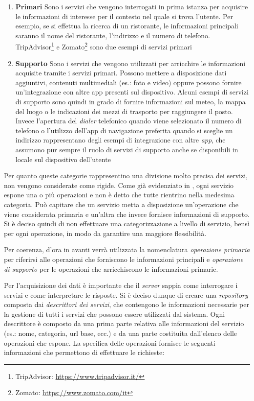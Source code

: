 \begin{enumerate}
	\item \textbf{Primari}
	Sono i servizi che vengono interrogati in prima istanza per acquisire le informazioni di interesse per il contesto nel quale si trova l'utente. Per esempio, se si effettua la ricerca di un ristorante, le informazioni principali saranno il nome del ristorante, l'indirizzo e il numero di telefono. TripAdvisor\footnote{TripAdvisor: \url{https://www.tripadvisor.it/}} e Zomato\footnote{Zomato: \url{https://www.zomato.com/it}} sono due esempi di servizi primari
	\item \textbf{Supporto}
	Sono i servizi che vengono utilizzati per arricchire le informazioni acquisite tramite i servizi primari. Possono mettere a disposizione dati aggiuntivi, contenuti multimediali (es.: foto e video) oppure possono fornire un'integrazione con altre app presenti sul dispositivo. Alcuni esempi di servizi di supporto sono quindi in grado di fornire informazioni sul meteo, la mappa del luogo o le indicazioni dei mezzi di trasporto per raggiungere il posto. Invece l'apertura del \emph{dialer} telefonico quando viene selezionato il numero di telefono o l'utilizzo dell'app di navigazione preferita quando si sceglie un indirizzo rappresentano degli esempi di integrazione con altre \emph{app}, che assumono pur sempre il ruolo di servizi di supporto anche se disponibili in locale sul dispositivo dell'utente
\end{enumerate}

Per quanto queste categorie rappresentino una divisione molto precisa dei servizi, non vengono considerate come rigide. Come già evidenziato in \cite{rizzo2015progettazione}, ogni servizio espone una o più operazioni e non è detto che tutte rientrino nella medesima categoria. Può capitare che un servizio metta a disposizione un'operazione che viene considerata primaria e un'altra che invece fornisce informazioni di supporto. Si è deciso quindi di non effettuare una categorizzazione a livello di servizio, bensì per ogni operazione, in modo da garantire una maggiore flessibilità.

Per coerenza, d'ora in avanti verrà utilizzata la nomenclatura \emph{operazione primaria} per riferirsi alle operazioni che forniscono le informazioni principali e \emph{operazione di supporto} per le operazioni che arricchiscono le informazioni primarie.

Per l'acquisizione dei dati è importante che il \emph{server} sappia come interrogare i servizi e come interpretare le risposte. Si è deciso dunque di creare una \emph{repository} composta dai \emph{descrittori dei servizi}, che contengono le informazioni necessarie per la gestione di tutti i servizi che possono essere utilizzati dal sistema. Ogni descrittore è composto da una prima parte relativa alle informazioni del servizio (es.: nome, categoria, url base, ecc.) e da una parte costituita dall'elenco delle operazioni che espone. La specifica delle operazioni fornisce le seguenti informazioni che permettono di effettuare le richieste:

